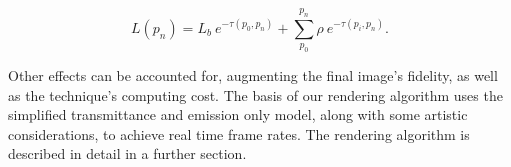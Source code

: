 \begin{equation} \label{eq:ray_radiance}  
  L(p_n) = L_b \ e^{-\tau(p_0, p_n)} + \sum_{p_0}^{p_n} \rho \ e^{-\tau(p_i,p_n)}.
\end{equation}

Other effects can be accounted for, augmenting the final image's fidelity, as well as the technique's computing cost. 
The basis of our rendering algorithm uses the simplified transmittance and emission only model, along with some artistic considerations, to achieve real time frame rates.
The rendering algorithm is described in detail in a further section. 




